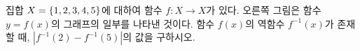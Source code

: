 \noindent\begin{minipage}[t]{0.58\linewidth}\vspace{0pt}\raggedright 집합 $X=\{1{,}\mkern3mu\mathopen{}2{,}\mkern3mu\mathopen{}3{,}\mkern3mu\mathopen{}4{,}\mkern3mu\mathopen{}5\}$에 대하여 함수 $f:X\longrightarrow X$가 있다. 오른쪽 그림은 함수 $y=f(x)$의 그래프의 일부를 나타낸 것이다. 함수 $f(x)$의 역함수 $f^{-1}(x)$가 존재할 때, $|f^{-1}(2)-f^{-1}(5)|$의 값을 구하시오.\end{minipage}\hfill\begin{minipage}[t]{0.4\linewidth}\vspace{0pt}\centering \resizebox{\ifdim\width>\linewidth\linewidth\else\width\fi}{!}{}\end{minipage}\par
